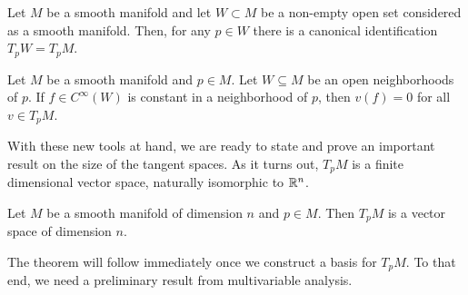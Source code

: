 \begin{corollary}\label{cor:tgsubspace}
  Let $M$ be a smooth manifold and let $W\subset M$ be a non-empty open set considered as a smooth manifold.
  Then, for any $p\in W$ there is a canonical identification $T_pW = T_p M$.
\end{corollary}

\begin{corollary}\label{cor:derzero}
  Let $M$ be a smooth manifold and $p\in M$.
  Let $W\subseteq M$ be an open neighborhoods of $p$.
  If $f\in C^\infty(W)$ is constant in a neighborhood of $p$, then $v(f) = 0$ for all $v\in T_p M$.
\end{corollary}

With these new tools at hand, we are ready to state and prove an important result on the size of the tangent spaces.
As it turns out, $T_pM$ is a finite dimensional vector space, naturally isomorphic to $\mathbb{R}^n$.

\begin{theorem}\label{thm:dimensionTpM}
  Let $M$ be a smooth manifold of dimension $n$ and $p\in M$.
  Then $T_pM$ is a vector space of dimension $n$.
\end{theorem}

The theorem will follow immediately once we construct a basis for $T_pM$.
To that end, we need a preliminary result from multivariable analysis.

